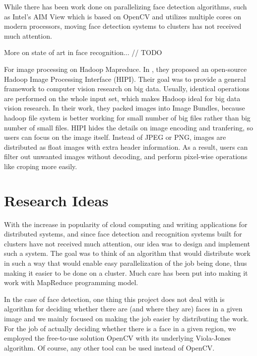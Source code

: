 \documentclass[11pt, draftclsnofoot, onecolumn]{IEEEtran}
\begin{document}
While there has been work done on parallelizing face detection algorithms, such as Intel's AIM View \cite{IC2012} which is based on OpenCV and utilizes multiple cores on modern processors, moving face detection systems to clusters has not received much attention. 

More on state of art in face recognition... // TODO

For image processing on Hadoop Mapreduce. In \cite{sweeney2011hipi}, they proposed an open-source Hadoop Image Processing Interface (HIPI). Their goal was to provide a general framework to computer vision research on big data. Usually, identical operations are performed on the whole input set, which makes Hadoop ideal for big data vision research. In their work, they packed images into Image Bundles, because hadoop file system is better working for small number of big files rather than big number of small files\cite{sweeney2011hipi}. HIPI hides the details on image encoding and tranfering, so users can focus on the image itself. Instead of JPEG or PNG, images are distributed as float images with extra header information. As a result, users can filter out unwanted images without decoding, and perform pixel-wise operations like croping more easily. 

\section{Research Ideas}  \label{sec:ideas}

With the increase in popularity of cloud computing and writing applications for distributed systems, and since face detection and recognition systems built for clusters have not received much attention, our idea was to design and implement such a system. The goal was to think of an algorithm that would distribute work in such a way that would enable easy parallelization of the job being done, thus making it easier to be done on a cluster. Much care has been put into making it work with MapReduce programming model.

In the case of face detection, one thing this project does not deal with is algorithm for deciding whether there are (and where they are) faces in a given image and we mainly focused on making the job easier by distributing the work. For the job of actually deciding whether there is a face in a given region, we employed the free-to-use solution OpenCV with its underlying Viola-Jones algorithm. Of course, any other tool can be used instead of OpenCV.
\end{document}
